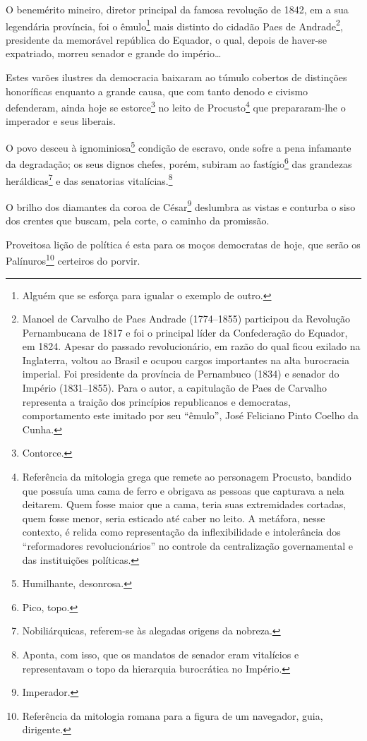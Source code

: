 O benemérito mineiro, diretor principal da famosa revolução de 1842, em
a sua legendária província, foi o êmulo\footnote{Alguém que se esforça
  para igualar o exemplo de outro.} mais distinto do cidadão Paes de
Andrade\footnote{Manoel de Carvalho de Paes Andrade (1774--1855)
  participou da Revolução Pernambucana de 1817 e foi o principal líder
  da Confederação do Equador, em 1824. Apesar do passado revolucionário,
  em razão do qual ficou exilado na Inglaterra, voltou ao Brasil e
  ocupou cargos importantes na alta burocracia imperial. Foi presidente
  da província de Pernambuco (1834) e senador do Império (1831--1855).
  Para o autor, a capitulação de Paes de Carvalho representa a traição
  dos princípios republicanos e democratas, comportamento este imitado
  por seu ``êmulo'', José Feliciano Pinto Coelho da Cunha.}, presidente da
memorável república do Equador, o qual, depois de haver-se expatriado,
morreu senador e grande do império\ldots{}

Estes varões ilustres da democracia baixaram ao túmulo cobertos de
distinções honoríficas enquanto a grande causa, que com tanto denodo e
civismo defenderam, ainda hoje se estorce\footnote{Contorce.} no leito
de Procusto\footnote{Referência da mitologia grega que remete ao
  personagem Procusto, bandido que possuía uma cama de ferro e obrigava
  as pessoas que capturava a nela deitarem. Quem fosse maior que a cama,
  teria suas extremidades cortadas, quem fosse menor, seria esticado até
  caber no leito. A metáfora, nesse contexto, é relida como
  representação da inflexibilidade e intolerância dos ``reformadores
  revolucionários'' no controle da centralização governamental e das
  instituições políticas.} que prepararam-lhe o imperador e seus
liberais.

O povo desceu à ignominiosa\footnote{Humilhante, desonrosa.} condição
de escravo, onde sofre a pena infamante da degradação; os seus dignos
chefes, porém, subiram ao fastígio\footnote{Pico, topo.} das grandezas
heráldicas\footnote{Nobiliárquicas, referem-se às alegadas origens da
  nobreza.} e das senatorias vitalícias.\footnote{Aponta, com isso,
  que os mandatos de senador eram vitalícios e representavam o topo da
  hierarquia burocrática no Império.}

O brilho dos diamantes da coroa de César\footnote{Imperador.}
deslumbra as vistas e conturba o siso dos crentes que buscam, pela
corte, o caminho da promissão.

Proveitosa lição de política é esta para os moços democratas de hoje,
que serão os Palínuros\footnote{Referência da mitologia romana para a
  figura de um navegador, guia, dirigente.} certeiros do porvir.

